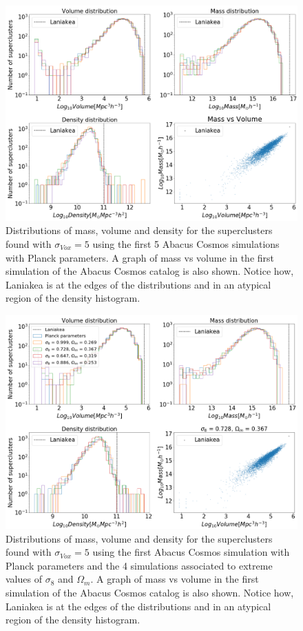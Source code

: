 \documentclass[usenatbib]{mnras}
\begin{document}
\begin{figure}
    \centering
    \includegraphics[width=435pt]{mass_vol_planck.pdf}
    \caption{Distributions of mass, volume and density for the superclusters found with $\sigma_{Vox} = 5$ using the first 5 Abacus Cosmos simulations with Planck parameters. A graph of mass vs volume in the first simulation of the Abacus Cosmos catalog is also shown. Notice how, Laniakea is at the edges of the distributions and in an atypical region of the density histogram. }
    \label{fig:HISTVMD1}
\end{figure}


\begin{figure}
    \centering
    \includegraphics[width=435pt]{mass_vol_different.pdf}
    \caption{Distributions of mass, volume and density for the superclusters found with $\sigma_{Vox} = 5$ using the first Abacus Cosmos simulation with Planck parameters and the 4 simulations associated to extreme values of $\sigma_8$ and $\Omega_m$. A graph of mass vs volume in the first simulation of the Abacus Cosmos catalog is also shown. Notice how, Laniakea is at the edges of the distributions and in an atypical region of the density histogram. }
    \label{fig:HISTVMD2}
\end{figure}
\end{document}
